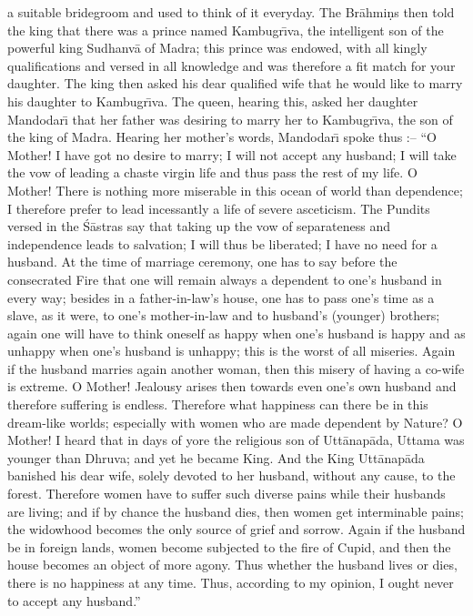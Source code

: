 a suitable bridegroom and used to think of it everyday. The Br\=ahmi\d{n}s then told the king that there was a prince named Kambugr\={\i}va, the intelligent son of the powerful king Sudhanv\=a of Madra; this prince was endowed, with all kingly qualifications and versed in all knowledge and was therefore a fit match for your daughter. The king then asked his dear qualified wife that he would like to marry his daughter to Kambugr\={\i}va. The queen, hearing this, asked her daughter Mandodar\={\i} that her father was desiring to marry her to Kambugr\={\i}va, the son of the king of Madra. Hearing her mother's words, Mandodar\={\i} spoke thus :-- ``O Mother! I have got no desire to marry; I will not accept any husband; I will take the vow of leading a chaste virgin life and thus pass the rest of my life. O Mother! There is nothing more miserable in this ocean of world than dependence; I therefore prefer to lead incessantly a life of severe asceticism. The Pundits versed in the \'S\=astras say that taking up the vow of separateness and independence leads to salvation; I will thus be liberated; I have no need for a husband. At the time of marriage ceremony, one has to say before the consecrated Fire that one will remain always a dependent to one's husband in every way; besides in a father-in-law's house, one has to pass one's time as a slave, as it were, to one's mother-in-law and to husband's (younger) brothers; again one will have to think oneself as happy when one's husband is happy and as unhappy when one's husband is unhappy; this is the worst of all miseries. Again if the husband marries again another woman, then this misery of having a co-wife is extreme. O Mother! Jealousy arises then towards even one's own husband and therefore suffering is endless. Therefore what happiness can there be in this dream-like worlds; especially with women who are made dependent by Nature? O Mother! I heard that in days of yore the religious son of Utt\=anap\=ada, Uttama was younger than Dhruva; and yet he became King. And the King Utt\=anap\=ada banished his dear wife, solely devoted to her husband, without any cause, to the forest. Therefore women have to suffer such diverse pains while their husbands are living; and if by chance the husband dies, then women get interminable pains; the widowhood becomes the only source of grief and sorrow. Again if the husband be in foreign lands, women become subjected to the fire of Cupid, and then the house becomes an object of more agony. Thus whether the husband lives or dies, there is no happiness at any time. Thus, according to my opinion, I ought never to accept any husband.''


